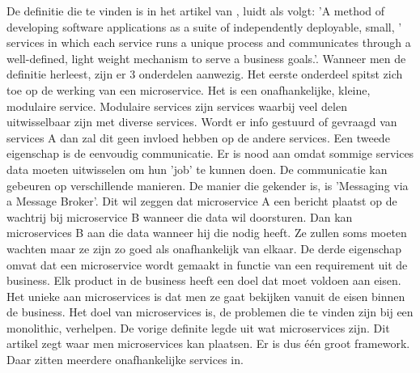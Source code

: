 De definitie die te vinden is in het artikel van \textcite{Mauersberger2017}, luidt als volgt: 'A method of developing software applications as a suite of independently deployable, small, ' services in which each service runs a unique process and communicates through a  well-defined, light weight mechanism to serve a business goals.'. Wanneer men de definitie herleest, zijn er 3 onderdelen aanwezig. Het eerste onderdeel spitst zich toe op de  werking van een microservice. Het is een onafhankelijke, kleine, modulaire service. Modulaire services zijn services waarbij veel delen uitwisselbaar zijn met diverse services. Wordt er info gestuurd of gevraagd van services A dan zal dit geen invloed hebben op de andere services. Een tweede eigenschap is de eenvoudig communicatie. Er is nood aan omdat sommige services data moeten uitwisselen om hun 'job' te kunnen doen. De communicatie kan gebeuren op verschillende manieren. De manier die gekender is, is 'Messaging via a Message Broker'. Dit wil zeggen dat microservice A een bericht plaatst op de wachtrij bij microservice B wanneer die data wil doorsturen. Dan kan microservices B aan die data wanneer hij die nodig heeft. Ze zullen soms moeten wachten maar ze zijn zo goed als onafhankelijk van elkaar. De derde eigenschap omvat dat een microservice wordt gemaakt in functie van een requirement uit de business. Elk product in de business heeft een doel dat moet voldoen aan eisen. Het unieke aan microservices is dat  men  ze gaat bekijken vanuit de eisen binnen de business. Het doel van microservices is, de problemen die te vinden zijn bij een monolithic, verhelpen. De vorige definite legde uit wat microservices zijn. Dit artikel zegt waar men microservices kan plaatsen. Er is dus één groot framework. Daar zitten meerdere onafhankelijke services in.

